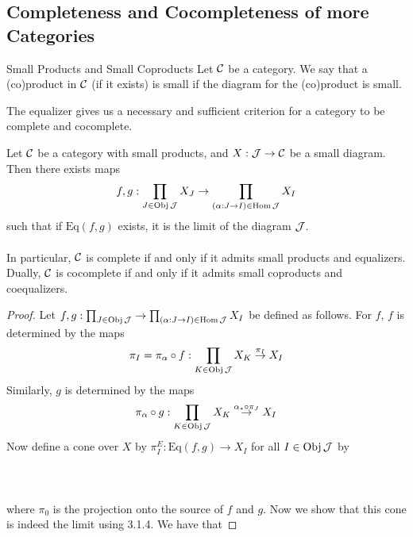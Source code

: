 \documentclass[a4paper]{article}
\begin{document}
\subsection{Completeness and Cocompleteness of more Categories}
\begin{defn}{Small Products and Small Coproducts}{} Let $\mathcal{C}$ be a category. We say that a (co)product in $\mathcal{C}$ (if it exists) is small if the diagram for the (co)product is small. 
\end{defn}

The equalizer gives us a necessary and sufficient criterion for a category to be complete and cocomplete. 

\begin{thm}{}{} Let $\mathcal{C}$ be a category with small products, and $X:\mathcal{J}\to\mathcal{C}$ be a small diagram. Then there exists maps $$f,g:\prod_{J\in\operatorname{Obj}\mathcal{J}}X_J\to\prod_{(\alpha:J\to I)\in\operatorname{Hom}\mathcal{J}}X_I$$ such that if $\text{Eq}(f,g)$ exists, it is the limit of the diagram $\mathcal{J}$. \\~\\

In particular, $\mathcal{C}$ is complete if and only if it admits small products and equalizers. Dually, $\mathcal{C}$ is cocomplete if and only if it admits small coproducts and coequalizers. \tcbline
\begin{proof}
Let $f,g:\prod_{J\in\operatorname{Obj}\mathcal{J}}\to\prod_{(\alpha:J\to I)\in\operatorname{Hom}\mathcal{J}}X_I$ be defined as follows. For $f$, $f$ is determined by the maps $$\pi_I=\pi_\alpha\circ f:\prod_{K\in\operatorname{Obj}\mathcal{J}}X_K\overset{\pi_I}{\rightarrow}X_I$$ Similarly, $g$ is determined by the maps $$\pi_\alpha\circ g:\prod_{K\in\operatorname{Obj}\mathcal{J}}X_K\overset{\alpha_\ast\circ\pi_J}{\rightarrow}X_I$$ Now define a cone over $X$ by $\pi_I^E:\text{Eq}(f,g)\to X_I$ for all $I\in\operatorname{Obj}\mathcal{J}$ by \\~\\
 \\~\\
where $\pi_0$ is the projection onto the source of $f$ and $g$. Now we show that this cone is indeed the limit using 3.1.4. We have that 


\end{proof}
\end{thm}
\end{document}
